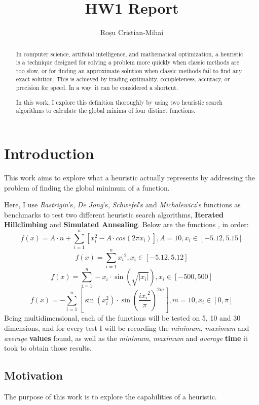 \documentclass{article}
\author{Roșu Cristian-Mihai}
\title{HW1 Report}
\begin{document}
\maketitle

\begin{abstract}
In computer science, artificial intelligence, and mathematical optimization, a heuristic is a technique designed for solving a problem more quickly when classic methods are too slow, or for finding an approximate solution when classic methods fail to find any exact solution. This is achieved by trading optimality, completeness, accuracy, or precision for speed. In a way, it can be considered a shortcut.

In this work, I explore this definition thoroughly by using two heuristic search algorithms to calculate the global minima of four distinct functions.
\end{abstract}

\section{Introduction}
This work aims to explore what a heuristic actually represents by addressing the problem of finding the global minimum of a function.

Here, I use \textit{Rastrigin}'s, \textit{De Jong}'s, \textit{Schwefel}'s and \textit{Michalewicz}'s functions as benchmarks to test two different heuristic search algorithms, \textbf{Iterated Hillclimbing} and \textbf{Simulated Annealing}. Below are the functions \cite{functions}, in order:
$$ f(x) = A \cdot n + \sum_{i=1}^n \left[ x_i^2 - A \cdot cos(2 \pi x_i) \right], A = 10, x_i \in \left[ -5.12, 5.15 \right] $$
$$ f(x) = \sum_{i=1}^n {x_i}^2, x_i \in \left[ -5.12, 5.12 \right] $$
$$ f(x) = \sum_{i=1}^n -x_i \cdot \sin(\sqrt{|x_i|}), x_i \in \left[ -500, 500 \right] $$
$$ f(x) = - \sum_{i=1}^n \left[ \sin(x_i^2) \cdot \sin(\frac{i{x_i}^2}{\pi})^{2m} \right], m = 10, x_i \in \left[ 0, \pi \right] $$
Being multidimensional, each of the functions will be tested on 5, 10 and 30 dimensions, and for every test I will be recording the \textsl{minimum}, \textsl{maximum} and \textsl{average} \textbf{values} found, as well as the \textsl{minimum}, \textsl{maximum} and \textsl{average} \textbf{time} it took to obtain those results.

\subsection{Motivation} 
The purpose of this work is to explore the capabilities of a heuristic.
\end{document}
